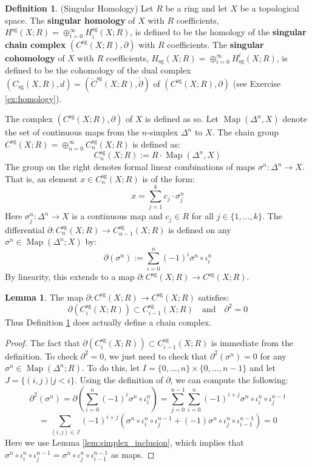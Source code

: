 \documentclass[12pt]{article}
\theoremstyle{definition}
\newtheorem{definition}[theorem]{Definition}
\numberwithin{equation}{section}
\newtheorem{lemma}[theorem]{Lemma}
\newcommand{\op}{\operatorname}
\begin{document}
\begin{definition} \label{def:singular_homology} (Singular Homology) Let $R$ be a ring and let $X$ be a topological space. The {\bf singular homology} of $X$ with $R$ coefficients, $H^{\op{sg}}(X;R) = \oplus_{i=0}^\infty H^{\op{sg}}_i(X;R)$, is defined to be the homology of the {\bf singular chain complex} $(C^{\op{sg}}(X;R), \partial)$ with $R$ coefficients. The {\bf singular cohomology} of $X$ with $R$ coefficients, $H_{\op{sg}}(X;R) = \oplus_{i=0}^\infty H_{\op{sg}}^i(X;R)$, is defined to be the cohomology of the dual complex $(C_{\op{sg}}(X,R),d) = (\check{C}^{\op{sg}}(X;R),\check{\partial})$ of $(C^{\op{sg}}(X;R),\partial)$ (see Exercise \ref{ex:homology}).

The complex $(C^{\op{sg}}(X;R), \partial)$ of $X$ is defined as so. Let $\op{Map}(\Delta^n,X)$ denote the set of continuous maps from the $n$-simplex $\Delta^n$ to $X$. The chain group $C^{\op{sg}}(X;R) = \oplus_{n=0}^\infty C^{\op{sg}}_n(X;R)$ is defined as:
\[
C^{\op{sg}}_n(X;R) := R \cdot \op{Map}(\Delta^n,X)
\]
The group on the right denotes formal linear combinations of maps $\sigma^n:\Delta^n \to X$. That is, an element $x \in C^{\op{sg}}_n(X;R)$ is of the form:
\[
x = \sum_{j=1}^k c_j \cdot \sigma^n_j
\]
Here $\sigma^n_j:\Delta^n \to X$ is a continuous map and $c_j \in R$ for all $j \in \{1,\dots,k\}$. The differential $\partial:C^{\op{sg}}_n(X;R) \to C^{\op{sg}}_{n-1}(X;R)$ is defined on any $\sigma^n \in \op{Map}(\Delta^n;X)$ by:
\[
\partial(\sigma^n) := \sum_{i=0}^n (-1)^i \sigma^n \circ \iota^n_i 
\]
By linearity, this extends to a map $\partial:C^{\op{sg}}(X;R) \to C^{\op{sg}}(X;R)$. 
\end{definition} 

\begin{lemma} The map $\partial:C^{\op{sg}}(X;R) \to C^{\op{sg}}(X;R)$ satisfies:
\[\partial(C^{\op{sg}}_i(X;R)) \subset C^{\op{sg}}_{i-1}(X;R) \quad\text{and}\quad \partial^2 = 0\]
Thus Definition \ref{def:singular_homology} does actually define a chain complex. 
\end{lemma}

\begin{proof} The fact that $\partial(C^{\op{sg}}_i(X;R)) \subset C^{\op{sg}}_{i-1}(X;R)$ is immediate from the definition. To check $\partial^2 = 0$, we just need to check that $\partial^2(\sigma^n) = 0$ for any $\sigma^n \in \op{Map}(\Delta^n;R)$. To do this, let $I = \{0,\dots,n\} \times \{0,\dots,n-1\}$ and let $J = \{(i,j)|j < i\}$. Using the definition of $\partial$, we can compute the following:
\[\partial^2(\sigma^n) = \partial(\sum_{i=0}^n (-1)^i \sigma^n \circ \iota^n_i) = \sum_{j=0}^{n-1} \sum_{i=0}^{n} (-1)^{i+j} \sigma^n \circ \iota^n_i \circ \iota^{n-1}_j \]
\[
= \sum_{(i,j) \in J} (-1)^{i+j}(\sigma^n \circ \iota^n_i \circ \iota^{n-1}_j + (-1)\sigma^n \circ \iota^n_j \circ \iota^{n-1}_{i-1}) = 0
\]
Here we use Lemma \ref{lem:simplex_inclusion}, which implies that $\sigma^n \circ \iota^n_i \circ \iota^{n-1}_j = \sigma^n \circ \iota^n_j \circ \iota^{n-1}_{i-1}$ as maps. 
\end{proof}
\end{document}
